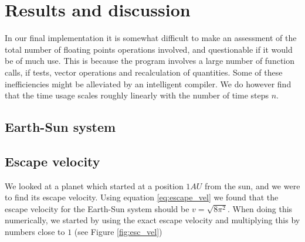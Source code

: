 \documentclass[%
 reprint,
 nobalance,
 amsmath,amssymb,
 aps,
]{revtex4-1}
\begin{document}


\section{Results and discussion}
In our final implementation it is somewhat difficult to make an assessment of the total number of floating points operations involved, and questionable if it would be of much use. This is because the program involves a large number of function calls, if tests, vector operations and recalculation of quantities. Some of these inefficiencies might be alleviated by an intelligent compiler. We do however find that the time usage scales roughly linearly with the number of time steps $n$.



\subsection{\label{sec:Sub1}Earth-Sun system}



\subsection{\label{sec:Sub1.5}Escape velocity}

We looked at a planet which started at a position $1AU$ from the sun, and we were to find its escape velocity. Using equation \ref{eq:escape_vel} we found that the escape velocity for the Earth-Sun system should be $v = \sqrt{8\pi^2}$. When doing this numerically, we started by using the exact escape velocity and multiplying this by numbers close to $1$ (see Figure \ref{fig:esc_vel})
\end{document}
